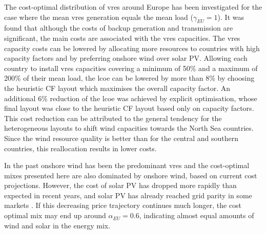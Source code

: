 \documentclass[a4paper, 5p, sort&compress]{elsarticle}%
\begin{document}
The cost-optimal distribution of \gls{vres} around Europe has been
investigated for the case where the mean \gls{vres} generation equals the
mean load ($\gamma_{EU} = 1$). It was found that although the costs of
backup generation and transmission are significant, the main costs are
associated with the \gls{vres} capacities. The \gls{vres} capacity costs can be
lowered by allocating more resources to countries with high capacity
factors and by preferring onshore wind over solar PV. Allowing each
country to install \gls{vres} capacities covering a minimum of 50\% and a
maximum of 200\% of their mean load, the \gls{lcoe} can be lowered by more
than 8\% by choosing the heuristic CF layout which maximises the
overall capacity factor. An additional 6\% reduction of the \gls{lcoe} was
achieved by explicit optimisation, whose final layout was close to the heuristic CF layout based only on capacity factors. This cost reduction can be
attributed to the general tendency for the heterogeneous layouts to
shift wind capacities towards the North Sea countries. Since the wind
resource quality is better than for the central and southern
countries, this reallocation results in lower costs.

In the past onshore wind has been the predominant \gls{vres} and the
cost-optimal mixes presented here are also dominated by onshore wind,
based on current cost projections.  However, the cost of solar PV has
dropped more rapidly than expected in recent years, and solar PV has
already reached grid parity in some markets \cite{solarGridParity}. If
this decreasing price trajectory continues much longer, the cost
optimal mix may end up around $\alpha_{EU} = 0.6$,
indicating almost equal amounts of wind and solar in the energy mix.


\end{document}
